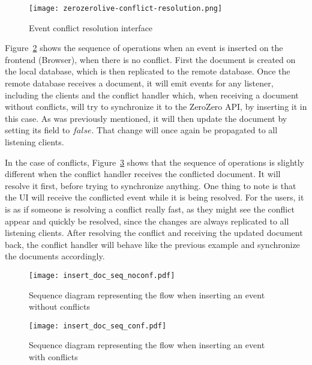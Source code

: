 \begin{figure}[ht]
    \begin{center}
        \leavevmode
        \texttt{[image: zerozerolive-conflict-resolution.png]}
        \caption{Event conflict resolution interface}
        \label{fig:zerozerolive-conflict-resolution}
    \end{center}
\end{figure}

Figure~\ref{fig:insert_doc_seq_noconf} shows the sequence of operations when an event is inserted on the frontend (Browser), when there is no conflict. First the document is created on the local database, which is then replicated to the remote database. Once the remote database receives a document, it will emit events for any listener, including the clients and the conflict handler which, when receiving a document without conflicts, will try to synchronize it to the ZeroZero API, by inserting it in this case. As was previously mentioned, it will then update the document by setting its  field to $false$. That change will once again be propagated to all listening clients.

In the case of conflicts, Figure~\ref{fig:insert_doc_seq_conf} shows that the sequence of operations is slightly different when the conflict handler receives the conflicted document. It will resolve it first, before trying to synchronize anything. One thing to note is that the UI will receive the conflicted event while it is being resolved. For the users, it is as if someone is resolving a conflict really fast, as they might see the conflict appear and quickly be resolved, since the changes are always replicated to all listening clients. After resolving the conflict and receiving the updated document back, the conflict handler will behave like the previous example and synchronize the documents accordingly.

\begin{figure}[ht]
    \begin{center}
        \leavevmode
        \texttt{[image: insert\_doc\_seq\_noconf.pdf]}
        \caption{Sequence diagram representing the flow when inserting an event without conflicts}
        \label{fig:insert_doc_seq_noconf}
    \end{center}
\end{figure}

\begin{figure}[ht]
    \begin{center}
        \leavevmode
        \texttt{[image: insert\_doc\_seq\_conf.pdf]}
        \caption{Sequence diagram representing the flow when inserting an event with conflicts}
        \label{fig:insert_doc_seq_conf}
    \end{center}
\end{figure}

